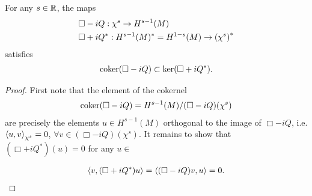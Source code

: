 \documentclass[12pt]{article}
\begin{document}
\begin{flemma}
    For any $s \in \R$, the maps 
    \begin{align*}
    &\Box - iQ : \chi^s \to H^{s - 1}(M) \\
    &\Box + iQ^* : H^{s - 1}(M)^* = H^{1 -s}(M) \to \brac{\chi^{s}}^*
    \end{align*}
    satisfies 
    \begin{align*}
    \coker (\Box - iQ) \subset \ker (\Box + iQ^*). 
    \end{align*}
\end{flemma}
\begin{proof}
    First note that the element of the cokernel
    \begin{align*}
    \coker (\Box - iQ) = H^{s -1}(M) / (\Box - iQ)(\chi^s)
    \end{align*}
    are precisely the elements $u \in H^{s - 1}(M)$ orthogonal to the image of $\Box - iQ$, i.e. $\inprod[u, v]_{\chi^s} = 0$, $\forall v \in (\Box - iQ)(\chi^s)$. It remains to show that $(\Box + iQ^*)(u) = 0$ for any $u \in  $
    
    \begin{align*}
    \inprod[v, (\Box + iQ^*) u] = \inprod[(\Box - iQ)v, u] = 0. 
    \end{align*}
    
\end{proof}
\end{document}
